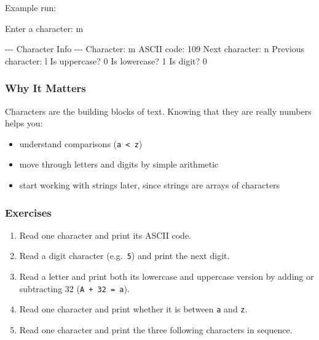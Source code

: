 \documentclass[
  letterpaper,
  DIV=11,
  numbers=noendperiod]{scrreprt}
\newenvironment{Shaded}{\begin{snugshade}}{\end{snugshade}}
\newcommand{\AttributeTok}[1]{\textcolor[rgb]{0.40,0.45,0.13}{#1}}
\newcommand{\ExtensionTok}[1]{\textcolor[rgb]{0.00,0.23,0.31}{#1}}
\newcommand{\NormalTok}[1]{\textcolor[rgb]{0.00,0.23,0.31}{#1}}
\newcommand{\PreprocessorTok}[1]{\textcolor[rgb]{0.68,0.00,0.00}{#1}}
\providecommand{\tightlist}{%
  \setlength{\itemsep}{0pt}\setlength{\parskip}{0pt}}
\begin{document}
Example run:

\begin{Shaded}
\begin{Highlighting}[]
\ExtensionTok{Enter}\NormalTok{ a character: m}

\ExtensionTok{{-}{-}{-}}\NormalTok{ Character Info }\AttributeTok{{-}{-}{-}}
\ExtensionTok{Character:}\NormalTok{ m}
\ExtensionTok{ASCII}\NormalTok{ code: 109}
\ExtensionTok{Next}\NormalTok{ character: n}
\ExtensionTok{Previous}\NormalTok{ character: l}
\ExtensionTok{Is}\NormalTok{ uppercase}\PreprocessorTok{?}\NormalTok{ 0}
\ExtensionTok{Is}\NormalTok{ lowercase}\PreprocessorTok{?}\NormalTok{ 1}
\ExtensionTok{Is}\NormalTok{ digit}\PreprocessorTok{?}\NormalTok{     0}
\end{Highlighting}
\end{Shaded}

\subsubsection{Why It Matters}\label{why-it-matters-12}

Characters are the building blocks of text. Knowing that they are really
numbers helps you:

\begin{itemize}
\tightlist
\item
  understand comparisons
  (\texttt{\textquotesingle{}a\textquotesingle{}\ \textless{}\ \textquotesingle{}z\textquotesingle{}})
\item
  move through letters and digits by simple arithmetic
\item
  start working with strings later, since strings are arrays of
  characters
\end{itemize}

\subsubsection{Exercises}\label{exercises-13}

\begin{enumerate}
\def\labelenumi{\arabic{enumi}.}
\tightlist
\item
  Read one character and print its ASCII code.
\item
  Read a digit character
  (e.g.~\texttt{\textquotesingle{}5\textquotesingle{}}) and print the
  next digit.
\item
  Read a letter and print both its lowercase and uppercase version by
  adding or subtracting 32
  (\texttt{\textquotesingle{}A\textquotesingle{}\ +\ 32\ =\ \textquotesingle{}a\textquotesingle{}}).
\item
  Read one character and print whether it is between
  \texttt{\textquotesingle{}a\textquotesingle{}} and
  \texttt{\textquotesingle{}z\textquotesingle{}}.
\item
  Read one character and print the three following characters in
  sequence.
\end{enumerate}
\end{document}
